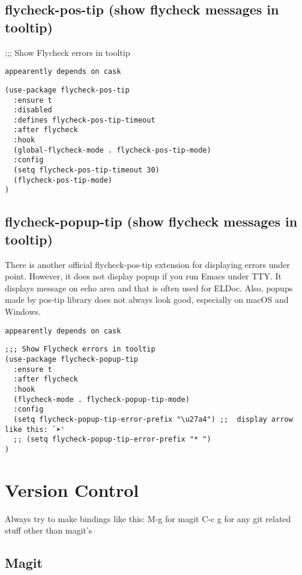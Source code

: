 \documentclass[11pt]{article}
\begin{document}
\subsection*{flycheck-pos-tip (show flycheck messages in tooltip)}
\label{sec:org1a0439b}

;;; Show Flycheck errors in tooltip

\begin{verbatim}
appearently depends on cask
\end{verbatim}


\begin{verbatim}
(use-package flycheck-pos-tip
  :ensure t
  :disabled
  :defines flycheck-pos-tip-timeout
  :after flycheck
  :hook
  (global-flycheck-mode . flycheck-pos-tip-mode)
  :config
  (setq flycheck-pos-tip-timeout 30)
  (flycheck-pos-tip-mode)
)
\end{verbatim}

\subsection*{flycheck-popup-tip (show flycheck messages in tooltip)}
\label{sec:orgd428ea3}

There is another official flycheck-pos-tip extension for displaying errors under point. However, it does not display popup if you run Emacs under TTY. It displays message on echo area and that is often used for ELDoc. Also, popups made by pos-tip library does not always look good, especially on macOS and Windows.
\begin{verbatim}
appearently depends on cask
\end{verbatim}


\begin{verbatim}
;;; Show Flycheck errors in tooltip
(use-package flycheck-popup-tip
  :ensure t
  :after flycheck
  :hook
  (flycheck-mode . flycheck-popup-tip-mode)
  :config
  (setq flycheck-popup-tip-error-prefix "\u27a4") ;;  display arrow like this: `➤'
  ;; (setq flycheck-popup-tip-error-prefix "* ")
)
\end{verbatim}


\section*{Version Control}
\label{sec:org7ab373e}

Always try to make bindings like this:
M-g for magit
C-c g for any git related stuff other than magit's

\subsection*{Magit}
\label{sec:org8e4c88d}
\end{document}
